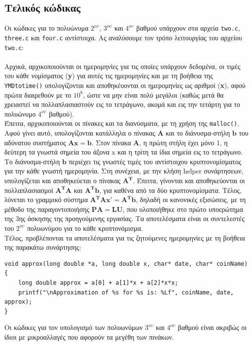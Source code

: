 \documentclass[a4paper, 14pt]{article}   %
\begin{document}
\subsection*{Τελικός κώδικας}   %
Οι κώδικες για το πολυώνυμα $2^{ου}$, $3^{ου}$ και $4^{ου}$ βαθμού υπάρχουν στα αρχεία \texttt{two.c}, \texttt{three.c} και \texttt{four.c} αντίστοιχα. Ας αναλύσουμε τον τρόπο λειτουργίας του αρχείου \texttt{two.c}:\\\\
Αρχικά, αρχικοποιούνται οι ημερομηνίες για τις οποίες υπάρχουν δεδομένα, οι τιμές του κάθε νομίσματος (\textbf{y}) για αυτές τις ημερομηνίες και με τη βοήθεια της \texttt{YMD\textunderscore to\textunderscore time()} υπολογίζονται και αποθηκέυονται οι ημερομηνίες ως αριθμοί (\textbf{x}), αφού πρώτα διαιρεθούν με το $10^8$, ώστε να μην είναι πολύ μεγάλοι (καθώς μετά θα χρειαστεί να πολλαπλασιαστούν εις το τετράγωνο, ακομά και εις την τετάρτη για το πολυώνυμο $4^{ου}$ βαθμού).\\
Έπειτα, αρχικοποιούνται οι πίνακες και τα διανύσματα, με τη χρήση της \texttt{malloc()}. Αφού γίνει αυτό, υπολογίζονται κατάλληλα ο πίνακας $\mathbf{A}$ και το διάνυσμα-στήλη $\mathbf{b}$ του αδύνατου συστήματος $\mathbf{A}\mathbf{x}=\mathbf{b}$. Στον πίνακα $\mathbf{A}$, η πρώτη στήλη έχει μόνο 1, η δεύτερη τα γνωστά σημεία του άξονα x και η τρίτη τα ίδια σημεία εις το τετράγωνο. Το διάνυσμα-στήλη $\mathbf{b}$ περιέχει τις γνωστές τιμές του αντίστοιχου κρυπτονομίσματος για την κάθε γνωστή ημερομηνία. Στη συνέχεια, με την κλήση helper συνάρτησεων, υπολογίζεται και αποθηκεύεται ο πίνακας $\mathbf{A^T}$. Έπειτα, γίνονται και αποθηκεύονται οι πολλαπλασιασμοί $\mathbf{A^T}\mathbf{A}$ και $\mathbf{A^T}\mathbf{b}$, για καθένα από τα δύο κρυπτονομίσματα. Τέλος, λύνεται το γραμμικό σύστημα $\mathbf{A^T}\mathbf{A}\mathbf{x'} = \mathbf{A^T}\mathbf{b}$, δηλαδή οι κανονικές εξισώσεις, με τη μέθοδο της παραγοντοποιήσης $\mathbf{PA=LU}$, που υλοποιήθηκε στο πρώτο υποερώτημα της 3ης άσκησης της προηγούμενης εργασίας. Τα αποτελέσματα είναι οι συντελεστές του $2^{ου}$ πολυωνύμου για το κάθε κρυπτονόμισμα.\\
Τέλος, προβλέπονται τα αποτελέσματα για τις ζητούμενες ημερομηνίες με τη βοήθεια της παρακάτω συνάρτησης:
\begin{lstlisting}
void approx(long double *a, long double x, char* date, char* coinName) {
    long double approx = a[0] + a[1]*x + a[2]*x*x;
    printf("\nApproximation of %s for %s is: %Lf", coinName, date, approx);
}
\end{lstlisting}
Οι κώδικες για τον υπολογισμό των πολυωνύμων  $3^{ου}$ και $4^{ου}$ βαθμού είναι ακριβώς οι ίδιοι με μικροαλλαγές που αφορούν τα μεγέθη των πινάκων.
\end{document}
